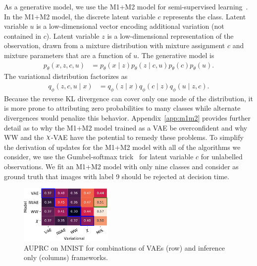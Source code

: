 As a generative model, we use the M1+M2 model for semi-supervised learning~\cite{KingmaRMW14}.
In the M1+M2 model, the discrete latent variable $c$ represents the class. Latent variable $u$ is a low-dimensional vector encoding additional variation (not contained in $c$). Latent variable $z$ is a low-dimensional representation of the observation, drawn from a mixture distribution with mixture assignment $c$ and mixture parameters that are a function of $u$.
The generative model is
\begin{align}
\label{eq:m1m2_gen}
    p_\theta(x, z, c, u) &= p_\theta(x \mid z)p_\theta(z \mid c, u)p_\theta(c)p_\theta(u).
\end{align}
The variational distribution factorizes as
\begin{align}
q_\phi(z, c, u \mid x) &= q_\phi(z \mid x)q_\phi(c \mid z)q_\phi(u \mid z, c).
\end{align}
Because the reverse KL divergence can cover only one mode of the distribution, it is more prone to attributing zero probabilities to many classes while alternate divergences would penalize this behavior. Appendix~\ref{app:m1m2} provides further detail as to why the M1+M2 model trained as a VAE be overconfident and why WW and the $\rchi$-VAE have the potential to remedy these problems. To simplify the derivation of updates for the M1+M2 model with all of the algorithms we consider, we use the Gumbel-softmax trick~\cite{jang2017categorical} for latent variable $c$ for unlabelled observations. We fit an M1+M2 model
with only nine classes and consider as ground truth that images with label 9 should be rejected at decision time.



\begin{figure}
    \centering
    \includegraphics[width=0.4\textwidth]{figures/mnist_AUC_cross.pdf}
    \caption[AUPRC on MNIST for combinations of VAEs and inference frameworks]{AUPRC on MNIST for combinations of VAEs (row) and inference only (columns) frameworks. }\label{fig:MNIST-cross}    
\end{figure}


